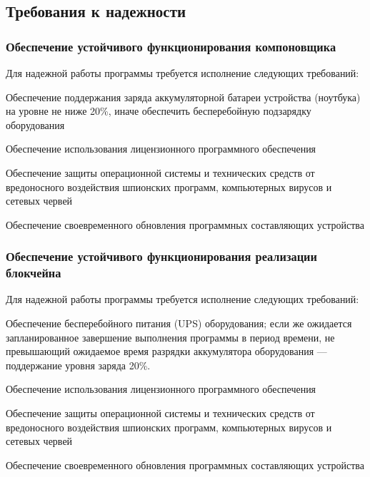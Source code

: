 \subsection{Требования к надежности}
\subsubsection{Обеспечение устойчивого функционирования компоновщика}

Для надежной работы программы требуется исполнение следующих требований:
\begin{my_enumerate}
    \item Обеспечение поддержания заряда аккумуляторной батареи устройства
          (ноутбука) на уровне не ниже 20\%, иначе обеспечить бесперебойную
          подзарядку оборудования
    \item Обеспечение использования лицензионного программного обеспечения
    \item Обеспечение защиты операционной системы и технических средств от
          вредоносного воздействия шпионских программ, компьютерных вирусов и
          сетевых червей
    \item Обеспечение своевременного обновления программных составляющих
          устройства
\end{my_enumerate}


\subsubsection{Обеспечение устойчивого функционирования реализации блокчейна}

Для надежной работы программы требуется исполнение следующих требований:
\begin{my_enumerate}
    \item Обеспечение бесперебойного питания (UPS) оборудования; если же
          ожидается запланированное завершение выполнения программы в период
          времени, не превышающий ожидаемое время разрядки аккумулятора
          оборудования --- поддержание уровня заряда 20\%.
    \item Обеспечение использования лицензионного программного обеспечения
    \item Обеспечение защиты операционной системы и технических средств от
          вредоносного воздействия шпионских программ, компьютерных вирусов и
          сетевых червей
    \item Обеспечение своевременного обновления программных составляющих
          устройства
\end{my_enumerate}


